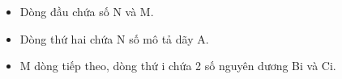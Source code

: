 \begin{itemize}
	\item     Dòng đầu chứa số N và M.   
	\item     Dòng thứ hai chứa N số mô tả dãy A.   
	\item     M dòng tiếp theo, dòng thứ i chứa 2 số nguyên dương Bi và Ci.   
\end{itemize}